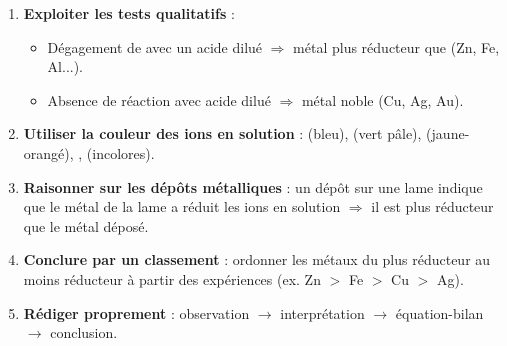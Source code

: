 \documentclass[11pt]{article}
\begin{document}
\begin{methode}
\begin{enumerate}
\item \textbf{Exploiter les tests qualitatifs} :
      \begin{itemize}
      \item Dégagement de  avec un acide dilué $\Rightarrow$ métal plus réducteur que  (Zn, Fe, Al...).
      \item Absence de réaction avec acide dilué $\Rightarrow$ métal noble (Cu, Ag, Au).
      \end{itemize}
\item \textbf{Utiliser la couleur des ions en solution} :  (bleu),  (vert pâle),  (jaune-orangé), ,  (incolores).
\item \textbf{Raisonner sur les dépôts métalliques} : un dépôt sur une lame indique que le métal de la lame a réduit les ions en solution $\Rightarrow$ il est plus réducteur que le métal déposé.
\item \textbf{Conclure par un classement} : ordonner les métaux du plus réducteur au moins réducteur à partir des expériences (ex. Zn $>$ Fe $>$ Cu $>$ Ag).
\item \textbf{Rédiger proprement} : observation $\rightarrow$ interprétation $\rightarrow$ équation-bilan $\rightarrow$ conclusion.
\end{enumerate}
\end{methode}
\end{document}
